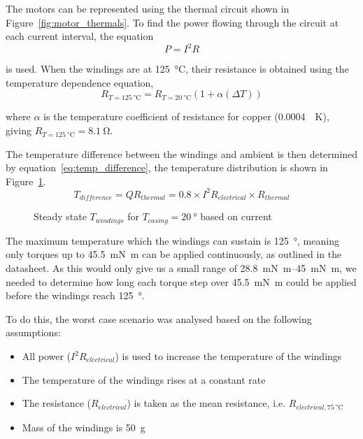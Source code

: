 The motors can be represented using the thermal circuit shown in Figure~\ref{fig:motor_thermals}.
To find the power flowing through the circuit at each current interval, the equation
\\
\begin{equation}
  P = I^2 R
\end{equation}

is used.
When the windings are at \SI{125}{\celsius}, their resistance is obtained using the temperature dependence equation,
\\
\begin{equation}
  R_{T=\SI{125}{\celsius}} = R_{T=\SI{20}{\celsius}} (1 + \alpha (\Delta T))
\end{equation}

where $\alpha$ is the temperature coefficient of resistance for copper (\SI{0.0004}{\per\kelvin}), giving $R_{T=\SI{125}{\celsius}} = \SI{8.1}{\ohm}$.

The temperature difference between the windings and ambient is then determined by equation~\ref{eq:temp_difference}, the temperature distribution is shown in Figure~\ref{fig:temp_windings}.
\\
\begin{equation}
  T_{difference} = Q R_{thermal} = 0.8 \times I^2 R_{electrical} \times R_{thermal}
  \label{eq:temp_difference}
\end{equation}

\begin{figure}
  
  \caption{Steady state $T_{windings}$ for $T_{casing} = \SI{20}{\degree}$ based on current}
  \label{fig:temp_windings}
\end{figure}

The maximum temperature which the windings can sustain is \SI{125}{\degree}, meaning only torques up to \SI{45.5}{\milli\newton\metre} can be applied continuously, as outlined in the datasheet.
As this would only give us a small range of \SIrange{28.8}{45}{\milli\newton\metre}, we needed to determine how long each torque step over \SI{45.5}{\milli\newton\metre} could be applied before the windings reach \SI{125}{\degree}.

To do this, the worst case scenario was analysed based on the following assumptions:

\begin{itemize}
  \item All power ($I^2R_{electrical}$) is used to increase the temperature of the windings
  \item The temperature of the windings rises at a constant rate
  \item The resistance ($R_{electrical}$) is taken as the mean resistance, i.e. $R_{electrical,\SI{75}{\celsius}}$
  \item Mass of the windings is \SI{50}{\gram}
\end{itemize}

